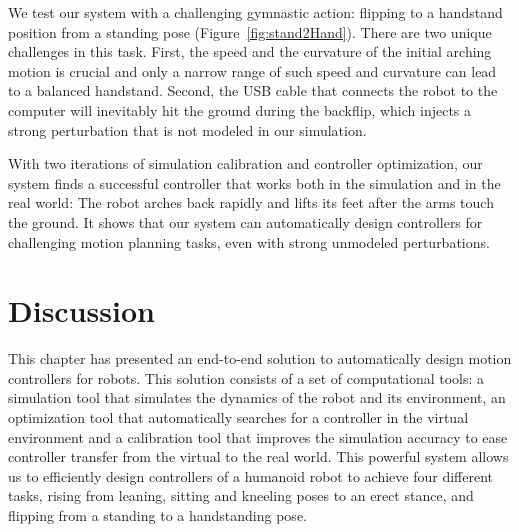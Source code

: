 We test our system with a challenging gymnastic action: flipping to a handstand position from a standing pose (Figure~\ref{fig:stand2Hand}). There are two unique challenges in this task. First, the speed and the curvature of the initial arching motion is crucial and only a narrow range of such speed and curvature can lead to a balanced handstand. Second, the USB cable that connects the robot to the computer will inevitably hit the ground during the backflip, which injects a strong perturbation that is not modeled in our simulation.

With two iterations of simulation calibration and controller optimization, our system finds a successful controller that works both in the simulation and in the real world: The robot arches back rapidly and lifts its feet after the arms touch the ground. It shows that our system can automatically design controllers for challenging motion planning tasks, even with strong unmodeled perturbations.


\section{Discussion}

This chapter has presented an end-to-end solution to automatically design motion controllers for robots. This solution consists of a set of computational tools: a simulation tool that simulates the dynamics of the robot and its environment, an optimization tool that automatically searches for a controller in the virtual environment and a calibration tool that improves the simulation accuracy to ease controller transfer from the virtual to the real world. This powerful system allows us to efficiently design controllers of a humanoid robot to achieve four different tasks, rising from leaning, sitting and kneeling poses to an erect stance, and flipping from a standing to a handstanding pose.

